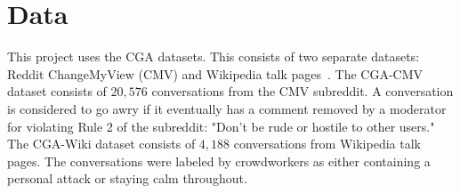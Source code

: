 \section{Data}

This project uses the CGA datasets.
This consists of two separate datasets: Reddit ChangeMyView (CMV) and Wikipedia talk pages~\citep{chang-danescu-niculescu-mizil-2019-trouble,zhang-etal-2018-conversations}.
The CGA-CMV dataset consists of $20,576$ conversations from the CMV subreddit.
A conversation is considered to go awry if it eventually has a comment removed by a moderator for violating Rule 2 of the subreddit: "Don't be rude or hostile to other users."
The CGA-Wiki dataset consists of $4,188$ conversations from Wikipedia talk pages.
The conversations were labeled by crowdworkers as either containing a personal attack or staying calm throughout.
